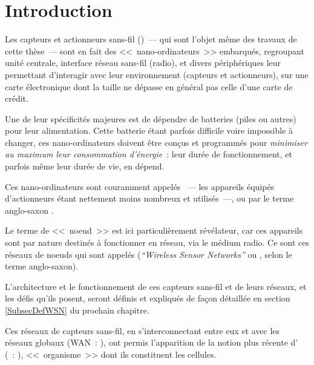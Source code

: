
\chapter{Introduction}
\label{ChIntro}

\vspace{-2mm}

Les capteurs et actionneurs sans-fil ()~--- qui sont l'objet même des travaux de cette thèse~---
sont en fait des <<~nano-ordinateurs~>> embarqués, regroupant unité
centrale, interface réseau sans-fil (radio), et divers périphériques
leur permettant d'interagir avec leur environnement (capteurs et
actionneurs), sur une carte électronique dont la taille ne dépasse
en général pas celle d'une carte de crédit.

Une de leur spécificités majeures est de dépendre de batteries (piles
ou autres) pour leur alimentation. Cette batterie étant parfois difficile
voire impossible à changer, ces nano-ordinateurs doivent être conçus
et programmés pour \emph{minimiser au maximum leur consommation d'énergie}~:
leur durée de fonctionnement, et parfois même leur durée de vie, en dépend.

Ces nano-ordinateurs sont couramment appelés ~---
les appareils équipés d'actionneurs étant nettement moins nombreux et
utilisés~---,  ou par le terme anglo-saxon
\emph{}.

Le terme de <<~noeud~>> est ici particulièrement révélateur, car ces
appareils sont par nature destinés à fonctionner en réseau, via le
médium radio. Ce sont ces réseaux de noeuds qui sont appelés
 (\emph{``Wireless Sensor Networks''}
ou , selon le terme anglo-saxon).

L'architecture et le fonctionnement de ces capteurs sans-fil et de leurs
réseaux, et les défis qu'ils posent, seront définis et expliqués de façon
détaillée en section \vref{SubsecDefWSN} du prochain chapitre.

Ces réseaux de capteurs sans-fil, en s'interconnectant entre eux
et avec les réseaux globaux (WAN~: ), ont permis
l'apparition de la notion plus récente d'
(~: ), <<~organisme~>> dont ils
constituent les cellules.

